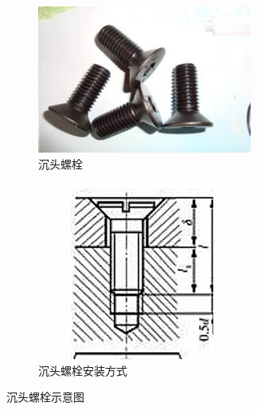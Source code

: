 \documentclass[UTF8]{article} %
\begin{document}
\begin{itemize}
  \begin{figure}[H]
    \centering
    \begin{subfigure}[b]{0.39\textwidth}
           \centering
           \includegraphics[width=\textwidth]{luo1.png}
            \caption{沉头螺栓}
    \end{subfigure}
    \quad
    \begin{subfigure}[b]{0.3\textwidth}
            \centering
            \includegraphics[width=\textwidth]{luo11.png}
            \caption{沉头螺栓安装方式}
    \end{subfigure}
    \caption{沉头螺栓示意图}
  \end{figure}


\end{itemize}
\end{document}
